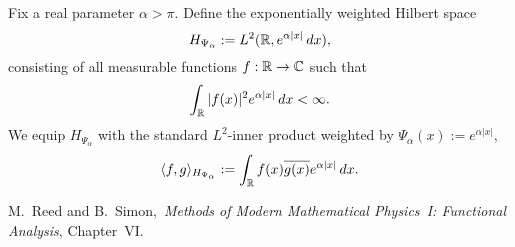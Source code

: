 \begin{definition}
\label{def:weighted_Hilbert_space_HPsi}
Fix a real parameter \( \alpha > \pi \). Define the exponentially weighted Hilbert space
\[
H_{\Psi_\alpha} := L^2(\mathbb{R}, e^{\alpha |x|} \, dx),
\]
consisting of all measurable functions \( f : \mathbb{R} \to \mathbb{C} \) such that
\[
\int_{\mathbb{R}} |f(x)|^2 e^{\alpha |x|} \, dx < \infty.
\]
We equip \( H_{\Psi_\alpha} \) with the standard \( L^2 \)-inner product weighted by \( \Psi_\alpha(x) := e^{\alpha|x|} \),
\[
\langle f, g \rangle_{H_{\Psi_\alpha}} := \int_{\mathbb{R}} f(x) \overline{g(x)} e^{\alpha |x|} \, dx.
\]

\begin{references}
  \item M.~Reed and B.~Simon,\ \emph{Methods of Modern Mathematical Physics~I: Functional Analysis}, Chapter~VI\cite{ReedSimon1980I}.
\end{references}
\end{definition}
